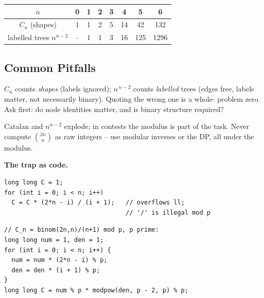 \begin{center}
\renewcommand{\arraystretch}{1.1}
\begin{tabular}{@{}c|ccccccc@{}}
\textbf{$n$}   & 0 & 1 & 2 & 3 & 4 & 5 & 6 \\ \hline
$C_n$ (shapes) & 1 & 1 & 2 & 5 & 14 & 42 & 132 \\
labelled trees $n^{n-2}$ & -- & 1 & 1 & 3 & 16 & 125 & 1296 \\
\end{tabular}
\end{center}

\subsection{Common Pitfalls}

\begin{warningbox}
$C_n$ counts \emph{shapes} (labels ignored); $n^{\,n-2}$ counts \emph{labelled} trees
(edges free, labels matter, not necessarily binary). Quoting the wrong one is a whole-
problem zero. Ask first: do node identities matter, and is binary structure required?
\end{warningbox}

\begin{warningbox}
Catalan and $n^{n-2}$ explode; in contests the modulus is part of the task. Never compute
$\binom{2n}{n}$ as raw integers -- use modular inverses or the DP, all under the modulus.
\end{warningbox}

\smallskip\noindent\textbf{The trap as code.}

\begin{lstlisting}[caption={\textcolor{warningred}{WRONG -- raw binomial, then reduce: explodes at $n\approx30$}}, basicstyle=\ttfamily\small, breaklines=true]
long long C = 1;
for (int i = 0; i < n; i++)
  C = C * (2*n - i) / (i + 1);   // overflows ll;
                                 // '/' is illegal mod p
\end{lstlisting}
\begin{lstlisting}[caption={\textcolor{successgreen}{RIGHT -- numerator/denominator as modular inverses}}, basicstyle=\ttfamily\small, breaklines=true]
// C_n = binom(2n,n)/(n+1) mod p, p prime:
long long num = 1, den = 1;
for (int i = 0; i < n; i++) {
  num = num * (2*n - i) % p;
  den = den * (i + 1) % p;
}
long long C = num % p * modpow(den, p - 2, p) % p;
\end{lstlisting}

